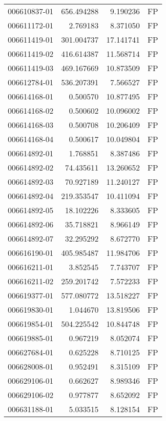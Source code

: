 \begin{tabular}{lrrl}
006610837-01 &  656.494288 &     9.190236 &   FP \\
006611172-01 &    2.769183 &     8.371050 &   FP \\
006611419-01 &  301.004737 &    17.141741 &   FP \\
006611419-02 &  416.614387 &    11.568714 &   FP \\
006611419-03 &  469.167669 &    10.873509 &   FP \\
006612784-01 &  536.207391 &     7.566527 &   FP \\
006614168-01 &    0.500570 &    10.877495 &   FP \\
006614168-02 &    0.500602 &    10.096002 &   FP \\
006614168-03 &    0.500708 &    10.206409 &   FP \\
006614168-04 &    0.500617 &    10.049804 &   FP \\
006614892-01 &    1.768851 &     8.387486 &   FP \\
006614892-02 &   74.435611 &    13.260652 &   FP \\
006614892-03 &   70.927189 &    11.240127 &   FP \\
006614892-04 &  219.353547 &    10.411094 &   FP \\
006614892-05 &   18.102226 &     8.333605 &   FP \\
006614892-06 &   35.718821 &     8.966149 &   FP \\
006614892-07 &   32.295292 &     8.672770 &   FP \\
006616190-01 &  405.985487 &    11.984706 &   FP \\
006616211-01 &    3.852545 &     7.743707 &   FP \\
006616211-02 &  259.201742 &     7.572233 &   FP \\
006619377-01 &  577.080772 &    13.518227 &   FP \\
006619830-01 &    1.044670 &    13.819506 &   FP \\
006619854-01 &  504.225542 &    10.844748 &   FP \\
006619885-01 &    0.967219 &     8.052074 &   FP \\
006627684-01 &    0.625228 &     8.710125 &   FP \\
006628008-01 &    0.952491 &     8.315109 &   FP \\
006629106-01 &    0.662627 &     8.989346 &   FP \\
006629106-02 &    0.977877 &     8.652092 &   FP \\
006631188-01 &    5.033515 &     8.128154 &   FP \\

\end{tabular}
